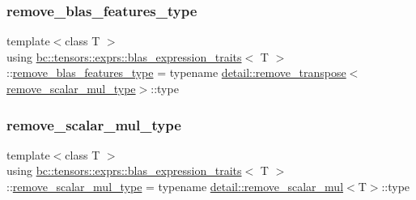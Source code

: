 \mbox{\label{structbc_1_1tensors_1_1exprs_1_1blas__expression__traits_afa81b694f7f66b5974416f37e90b148f}} 
\subsubsection{\texorpdfstring{remove\+\_\+blas\+\_\+features\+\_\+type}{remove\_blas\_features\_type}}
{\footnotesize\ttfamily template$<$class T $>$ \\
using \hyperlink{structbc_1_1tensors_1_1exprs_1_1blas__expression__traits}{bc\+::tensors\+::exprs\+::blas\+\_\+expression\+\_\+traits}$<$ T $>$\+::\hyperlink{structbc_1_1tensors_1_1exprs_1_1blas__expression__traits_afa81b694f7f66b5974416f37e90b148f}{remove\+\_\+blas\+\_\+features\+\_\+type} =  typename \hyperlink{structbc_1_1tensors_1_1exprs_1_1detail_1_1remove__transpose}{detail\+::remove\+\_\+transpose}$<$\hyperlink{structbc_1_1tensors_1_1exprs_1_1blas__expression__traits_a69dacf887c1ca2cf443865bd4668ccfe}{remove\+\_\+scalar\+\_\+mul\+\_\+type}$>$\+::type}

\mbox{\label{structbc_1_1tensors_1_1exprs_1_1blas__expression__traits_a69dacf887c1ca2cf443865bd4668ccfe}} 
\subsubsection{\texorpdfstring{remove\+\_\+scalar\+\_\+mul\+\_\+type}{remove\_scalar\_mul\_type}}
{\footnotesize\ttfamily template$<$class T $>$ \\
using \hyperlink{structbc_1_1tensors_1_1exprs_1_1blas__expression__traits}{bc\+::tensors\+::exprs\+::blas\+\_\+expression\+\_\+traits}$<$ T $>$\+::\hyperlink{structbc_1_1tensors_1_1exprs_1_1blas__expression__traits_a69dacf887c1ca2cf443865bd4668ccfe}{remove\+\_\+scalar\+\_\+mul\+\_\+type} =  typename \hyperlink{structbc_1_1tensors_1_1exprs_1_1detail_1_1remove__scalar__mul}{detail\+::remove\+\_\+scalar\+\_\+mul}$<$T$>$\+::type}


